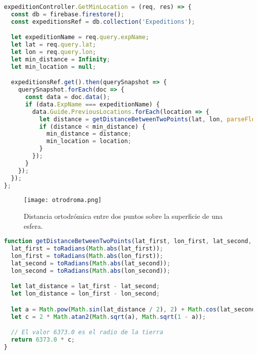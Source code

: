 \begin{lstlisting}[language=javascript,captionpos=t,caption={\textbf{Obtención de la localización más cercana a un punto dado}.},label={lst:getminlocation}]
expeditionController.GetMinLocation = (req, res) => {
  const db = firebase.firestore();
  const expeditionsRef = db.collection('Expeditions');

  let expeditionName = req.query.expName;
  let lat = req.query.lat;
  let lon = req.query.lon;
  let min_distance = Infinity;
  let min_location = null;

  expeditionsRef.get().then(querySnapshot => {
    querySnapshot.forEach(doc => {
      const data = doc.data();
      if (data.ExpName === expeditionName) {
        data.Guide.PreviousLocations.forEach(location => {
          let distance = getDistanceBetweenTwoPoints(lat, lon, parseFloat(location.Lat), parseFloat(location.Lon));
          if (distance < min_distance) {
            min_distance = distance;
            min_location = location;
          }
        });
      }
    });
  });
};
\end{lstlisting}

\begin{figure}
    \centering
    \texttt{[image: otrodroma.png]}
    \caption{Distancia ortodrómica entre dos puntos sobre la superficie de una esfera. \protect\footnotemark}
    \label{fig:ortodroma}
\end{figure}


\begin{lstlisting}[language=javascript,captionpos=t,caption={\textbf{Obtención de la distancia entre dos puntos usando la formula de \textit{Harvesine}.}},label={lst:harvesineformula}]
function getDistanceBetweenTwoPoints(lat_first, lon_first, lat_second, lon_second) {
  lat_first = toRadians(Math.abs(lat_first));
  lon_first = toRadians(Math.abs(lon_first));
  lat_second = toRadians(Math.abs(lat_second));
  lon_second = toRadians(Math.abs(lon_second));

  let lat_distance = lat_first - lat_second;
  let lon_distance = lon_first - lon_second;

  let a = Math.pow(Math.sin(lat_distance / 2), 2) + Math.cos(lat_second) * Math.cos(lat_first) * Math.pow(Math.sin(lon_distance / 2), 2);
  let c = 2 * Math.atan2(Math.sqrt(a), Math.sqrt(1 - a));

  // El valor 6373.0 es el radio de la tierra
  return 6373.0 * c;
}
\end{lstlisting}

